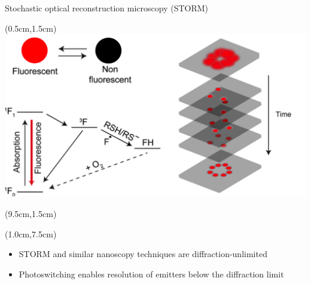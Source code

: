 \documentclass{beamer}					%
\begin{document}
\begin{frame}{Stochastic optical reconstruction microscopy (STORM)}
\begin{textblock*}{9cm}(0.5cm,1.5cm)
\includegraphics[width=\textwidth]{../../dissertation/dissertation/media/Intro-Cropped.png}
\end{textblock*}
\begin{textblock*}{5cm}(9.5cm,1.5cm)
\end{textblock*}
\begin{textblock*}{\textwidth}(1.0cm,7.5cm)
\begin{itemize}
\item STORM and similar nanoscopy techniques are diffraction-unlimited
\item Photoswitching enables resolution of emitters below the diffraction limit
\end{itemize}
\end{textblock*}
\end{frame}
\end{document}
